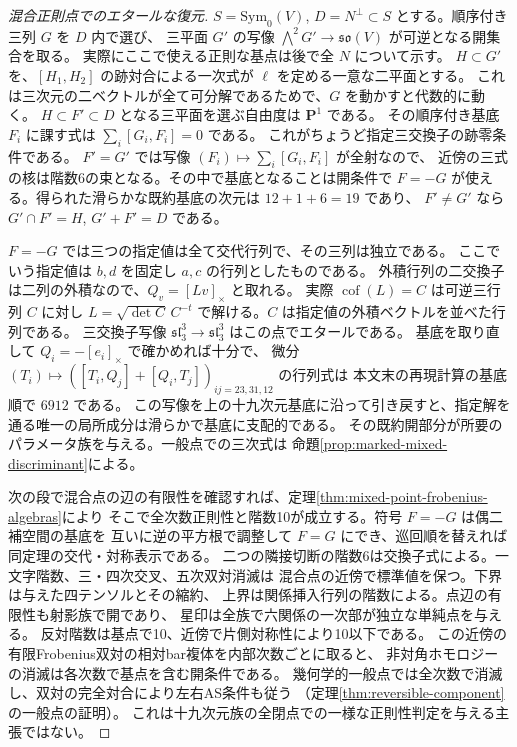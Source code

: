 \begin{proof}[混合正則点でのエタールな復元]
$S=\mathrm{Sym}_0(V)$, $D=N^\perp\subset S$ とする。順序付き三列 $G$ を $D$ 内で選び、
三平面 $G'$ の写像 $\bigwedge^2G'\to\mathfrak{so}(V)$ が可逆となる開集合を取る。
実際にここで使える正則な基点は後で全 $N$ について示す。
$H\subset G'$ を、$[H_1,H_2]$ の跡対合による一次式が $\ell$ を定める一意な二平面とする。
これは三次元の二ベクトルが全て可分解であるためで、$G$ を動かすと代数的に動く。
$H\subset F'\subset D$ となる三平面を選ぶ自由度は $\mathbf P^1$ である。
その順序付き基底 $F_i$ に課す式は $\sum_i[G_i,F_i]=0$ である。
これがちょうど指定三交換子の跡零条件である。
$F'=G'$ では写像 $(F_i)\mapsto\sum_i[G_i,F_i]$ が全射なので、
近傍の三式の核は階数6の束となる。その中で基底となることは開条件で
$F=-G$ が使える。得られた滑らかな既約基底の次元は $12+1+6=19$ であり、
$F'\ne G'$ なら $G'\cap F'=H$, $G'+F'=D$ である。

$F=-G$ では三つの指定値は全て交代行列で、その三列は独立である。
ここでいう指定値は $b,d$ を固定し $a,c$ の行列としたものである。
外積行列の二交換子は二列の外積なので、$Q_v=[Lv]_\times$ と取れる。
実際 $\operatorname{cof}(L)=C$ は可逆三行列 $C$ に対し
$L=\sqrt{\det C}\,C^{-t}$ で解ける。$C$ は指定値の外積ベクトルを並べた行列である。
三交換子写像 $\mathfrak{sl}_3^3\to\mathfrak{sl}_3^3$ はこの点でエタールである。
基底を取り直して $Q_i=-[e_i]_\times$ で確かめれば十分で、
微分 $(T_i)\mapsto([T_i,Q_j]+[Q_i,T_j])_{ij=23,31,12}$ の行列式は
本文末の再現計算の基底順で $6912$ である。
この写像を上の十九次元基底に沿って引き戻すと、指定解を通る唯一の局所成分は滑らかで基底に支配的である。
その既約開部分が所要のパラメータ族を与える。一般点での三次式は
命題\ref{prop:marked-mixed-discriminant}による。

次の段で混合点の辺の有限性を確認すれば、定理\ref{thm:mixed-point-frobenius-algebras}により
そこで全次数正則性と階数10が成立する。符号 $F=-G$ は偶二補空間の基底を
互いに逆の平方根で調整して $F=G$ にでき、巡回順を替えれば同定理の交代・対称表示である。
二つの隣接切断の階数6は交換子式による。一文字階数、三・四次交叉、五次双対消滅は
混合点の近傍で標準値を保つ。下界は与えた四テンソルとその縮約、
上界は関係挿入行列の階数による。点辺の有限性も射影族で開であり、
星印は全族で六関係の一次部が独立な単純点を与える。
反対階数は基点で10、近傍で片側対称性により10以下である。
この近傍の有限Frobenius双対の相対bar複体を内部次数ごとに取ると、
非対角ホモロジーの消滅は各次数で基点を含む開条件である。
幾何学的一般点では全次数で消滅し、双対の完全対合により左右AS条件も従う
（定理\ref{thm:reversible-component}の一般点の証明）。
これは十九次元族の全閉点での一様な正則性判定を与える主張ではない。
\end{proof}

